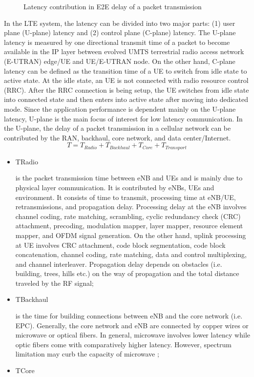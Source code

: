 \documentclass[conference]{IEEEtran}
\begin{document}
\begin{enumerate}
\begin{figure}
  \caption{ Latency contribution in E2E delay of a packet transmission \cite{delay}}
  \label{fig:delay}
\end{figure}
In the LTE system, the latency can be divided into two
major parts: (1) user plane (U-plane) latency and (2) control
plane (C-plane) latency. The U-plane latency is measured by 
one directional transmit time of a packet to become available
in the IP layer between evolved UMTS terrestrial radio access
network (E-UTRAN) edge/UE and UE/E-UTRAN node.
On the other hand, C-plane latency can be defined as the
transition time of a UE to switch from idle state to active
state. At the idle state, an UE is not connected with radio
resource control (RRC). After the RRC connection is being
setup, the UE switches from idle state into connected state
and then enters into active state after moving into dedicated
mode. Since the application performance is dependent mainly
on the U-plane latency, U-plane is the main focus of interest
for low latency communication.
In the U-plane, the delay of a packet transmission in a
cellular network can be contributed by the RAN, backhaul,
core network, and data center/Internet.
\begin{equation}
T = T_{Radio} + T_{Backhaul} + T_{Core} + T_{Transport}
\end{equation}
\begin{itemize}
\item TRadio

 is the packet transmission time between eNB and
UEs and is mainly due to physical layer communication.
It is contributed by eNBs, UEs and environment. It
consists of time to transmit, processing time at eNB/UE,
retransmissions, and propagation delay. Processing delay at the eNB involves channel coding, rate matching,
scrambling, cyclic redundancy check (CRC) attachment,
precoding, modulation mapper, layer mapper, resource
element mapper, and OFDM signal generation. On the
other hand, uplink processing at UE involves CRC attachment, code block segmentation, code block concatenation, channel coding, rate matching, data and control
multiplexing, and channel interleaver. Propagation delay
depends on obstacles (i.e. building, trees, hills etc.) on
the way of propagation and the total distance traveled by
the RF signal;
\item TBackhaul

 is the time for building connections between
eNB and the core network (i.e. EPC). Generally, the core
network and eNB are connected by copper wires or microwave or optical fibers. In general, microwave involves
lower latency while optic fibers come with comparatively
higher latency. However, spectrum limitation may curb
the capacity of microwave ;
\item TCore


\end{itemize}
\end{enumerate}
\end{document}
